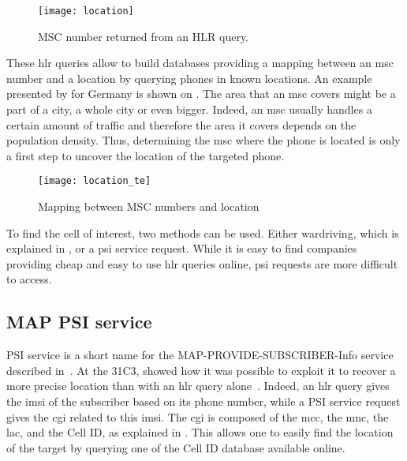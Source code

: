       \begin{figure}
        \centering
        \texttt{[image: location]}
        \caption{MSC number returned from an HLR query.}
        \label{fig:location}
      \end{figure}
      
      These \gls{hlr} queries allow to build databases providing a
      mapping between an \gls{msc} number and a location by querying
      phones in known locations. An example presented by
       for Germany is shown on
      . The area that an \gls{msc} covers might be
      a part of a city, a whole city or even bigger. Indeed, an
      \gls{msc} usually handles a certain amount of traffic and
      therefore the area it covers depends on the population density.
      Thus, determining the \gls{msc} where the phone is located is only
      a first step to uncover the location of the targeted phone.

      \begin{figure}
        \centering
        \texttt{[image: location\_te]}
        \caption{Mapping between MSC numbers and
        location~\cite{engel_locating_2008}}
        \label{fig:location_te}
      \end{figure}

      To find the cell of interest, two methods can be used. Either
      wardriving, which is explained in ,
      or a \gls{psi} service request. While it is easy to find companies
      providing cheap and easy to use \gls{hlr} queries online,
      \gls{psi} requests are more difficult to access.

    \subsection{MAP PSI service}

      PSI service is a short name for the MAP-PROVIDE-SUBSCRIBER-Info
      service described in~. At the 31C3,  showed how it was possible to exploit it to recover a more
      precise location than with an \gls{hlr} query
      alone~\cite{nohl_mobile_2014}. Indeed, an \gls{hlr} query gives
      the \gls{imsi} of the subscriber based on its phone number, while
      a PSI service request gives the \gls{cgi} related to this
      \gls{imsi}. The \gls{cgi} is composed of the \gls{mcc}, the
      \gls{mnc}, the \gls{lac}, and the Cell ID, as explained in
      . This allows one to easily find the location of the
      target by querying one of the Cell ID database available online.

